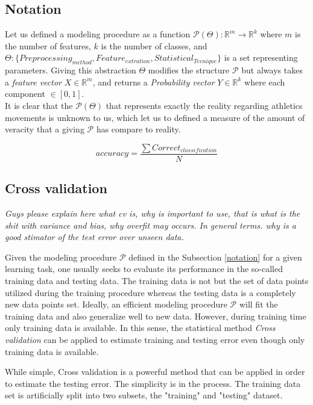 \subsection{Notation}
Let us defined a modeling procedure as  a function $\mathcal{P}(\Theta): \mathbb{R}^{m} \longrightarrow \mathbb{R}^{k}$ where $m$ is the number of features, $k$ is the number of classes, and $\Theta : \{Preprocessing_{method}, Feature_{extration}, Statistical_{Tecnique} \}$ is a set representing parameters. Giving this abstraction $\Theta$ modifies the structure  $\mathcal{P}$ but always takes a \textit{feature vector} $X \in  \mathbb{R}^{m}$, and returns a \textit{Probability vector} $Y \in  \mathbb{R}^{k}$ where each component $\in  [0,1]$.\\

It is clear that the $\mathcal{P}(\Theta)$ that represents exactly the reality regarding athletics movements is unknown to us, which let us to defined a measure of the amount of veracity that a giving $\mathcal{P}$ has compare to reality.

\begin{equation}
accuracy=  \frac{\sum Correct_{classification}}{N}
\end{equation}

\subsection{Cross validation}

\textit{Guys please explain here what cv is, why is important to use, that is what is the shit with variance and bias, why overfit may occurs. In general terms. why is a good stimator of the test error over unseen data.}

Given the modeling procedure $\mathcal{P}$ defined in the Subsection \ref{notation} 
for a given learning task, one usually seeks to evaluate its performance in the 
so-called training data and testing data. The training data is not but the set of 
data points utilized during the training procedure whereas the testing data is a 
completely new data points set. Ideally, an efficient modeling procedure 
$\mathcal{P}$ will fit the training data and also generalize well to new data. 
However, during training time only training data is available. In this sense, the 
statistical method \textit{Cross validation} can be applied to estimate training 
and testing error even though only training data is available.

While simple, Cross validation is a powerful method that can be applied in order
to estimate the testing error. The simplicity is in the process. The training data
set is artificially split into two subsets, the "training" and "testing" dataset.


